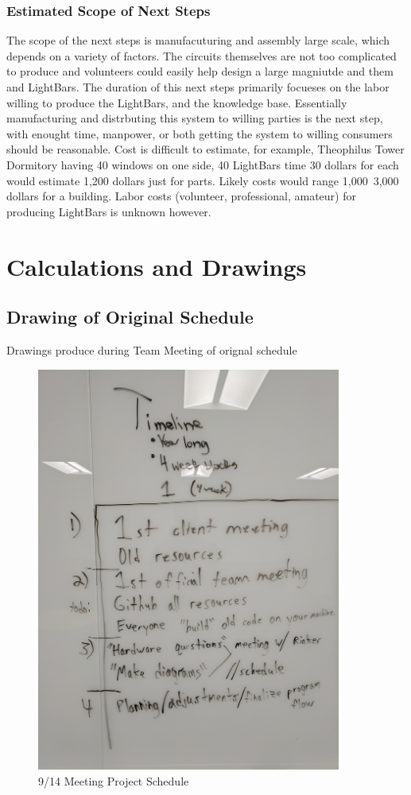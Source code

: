 \documentclass[12pt]{article}
\begin{document}
{{{{		\subsubsection{Estimated Scope of Next Steps}
		The scope of the next steps is manufacuturing and assembly large scale, which depends on a variety of factors. The circuits themselves are not too complicated to produce and volunteers could easily help design a large magniutde and them and LightBars. The duration of this next steps primarily focueses on the labor willing to produce the LightBars, and the knowledge base. Essentially manufacturing and distrbuting this system to willing parties is the next step, with enought time, manpower, or both getting the system to willing consumers should be reasonable. Cost is difficult to estimate, for example,  Theophilus Tower Dormitory having 40 windows on one side, 40 LightBars time 30 dollars for each would estimate 1,200 dollars just for parts. Likely costs would range 1,000~3,000 dollars for a building. Labor costs (volunteer, professional, amateur) for producing LightBars is unknown however.
		
		\newpage
	
\appendix	
	\section{Calculations and Drawings}
	
		\subsection{Drawing of Original Schedule}
		Drawings produce during Team Meeting of orignal schedule
			\begin{figure}[!htb]
				\centering
				\includegraphics[width=100mm]{assets/9-14_Project_Agenda_1.jpg}
				\caption{9/14 Meeting Project Schedule \label{overflow}}
			\end{figure}
			
}}}}
\end{document}
